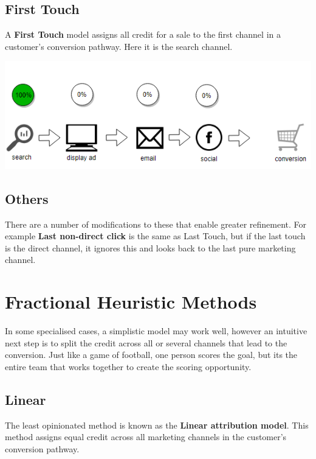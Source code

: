 \documentclass[]{book}
\begin{document}
\hypertarget{first-touch}{%
\subsection{First Touch}\label{first-touch}}

A \textbf{First Touch} model assigns all credit for a sale to the first channel
in a customer's conversion pathway. Here it is the search channel.

\includegraphics[width=5.65in]{img/first_touch}

\hypertarget{others}{%
\subsection{Others}\label{others}}

There are a number of modifications to these that enable greater refinement. For
example \textbf{Last non-direct click} is the same as Last Touch, but if the last
touch is the direct channel, it ignores this and looks back to the last
pure marketing channel.

\hypertarget{fractional-heuristic-methods}{%
\section{Fractional Heuristic Methods}\label{fractional-heuristic-methods}}

In some specialised cases, a simplistic model may work well, however an intuitive
next step is to split the credit across all or several channels that lead to
the conversion. Just like a game of football, one person scores the goal, but
its the entire team that works together to create the scoring opportunity.

\hypertarget{linear}{%
\subsection{Linear}\label{linear}}

The least opinionated method is known as the \textbf{Linear attribution model}.
This method assigns equal credit across all marketing channels in the customer's
conversion pathway.
\end{document}
